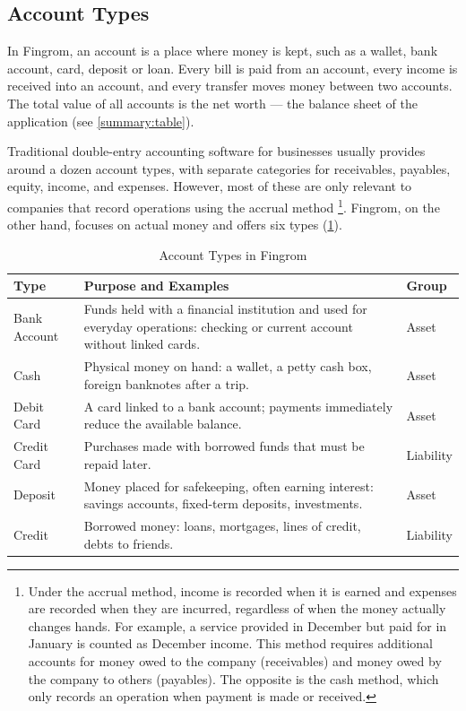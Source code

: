 
\subsection{Account Types}

In Fingrom, an account is a place where money is kept, such as a wallet, bank account, card,
deposit or loan. Every bill is paid from an account, every income is received into an
account, and every transfer moves money between two accounts. The total value of all accounts
is the net worth — the balance sheet of the application (see \cref{summary:table}).

Traditional double-entry accounting software for businesses usually provides around a dozen
account types, with separate categories for receivables, payables, equity, income, and
expenses. However, most of these are only relevant to companies that record operations using
the accrual method \footnote{Under the accrual method, income is recorded when it is earned
and expenses are recorded when they are incurred, regardless of when the money actually
changes hands. For example, a service provided in December but paid for in January is counted
as December income. This method requires additional accounts for money owed to the company
(receivables) and money owed by the company to others (payables). The opposite is the cash
method, which only records an operation when payment is made or received.}. Fingrom, on the
other hand, focuses on actual money and offers six types (\cref{tb:account-types}).

\begin{table}[h!]
\begin{center}
\begin{tabularx}{\textwidth}{|l|X|l|}
  \hline
  \textbf{Type} & \textbf{Purpose and Examples} & \textbf{Group} \\
  \hline
  Bank Account & Funds held with a financial institution and used for everyday operations:
  checking or current account without linked cards. & Asset \\
  \hline
  Cash & Physical money on hand: a wallet, a petty cash box, foreign banknotes after a
  trip. & Asset \\
  \hline
  Debit Card & A card linked to a bank account; payments immediately reduce the available
  balance. & Asset \\
  \hline
  Credit Card & Purchases made with borrowed funds that must be repaid later. & Liability \\
  \hline
  Deposit & Money placed for safekeeping, often earning interest: savings accounts,
  fixed-term deposits, investments. & Asset \\
  \hline
  Credit & Borrowed money: loans, mortgages, lines of credit, debts to friends. & Liability \\
  \hline
\end{tabularx}
\end{center}
  \caption{Account Types in Fingrom} \label{tb:account-types}
\end{table}



